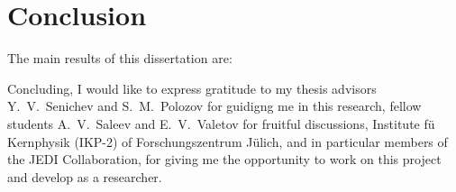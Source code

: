\chapter*{Conclusion}                       %


The main results of this dissertation are:


Concluding, I would like to express gratitude to my thesis advisors Y.~V.~Senichev and S.~M.~Polozov for guidigng me in this research, fellow students A.~V.~Saleev and E.~V.~Valetov for fruitful discussions, Institute f\"u Kernphysik (IKP-2) of Forschungszentrum J\"ulich, and in particular members of the JEDI Collaboration, for giving me the opportunity to work on this project and develop as a researcher.
